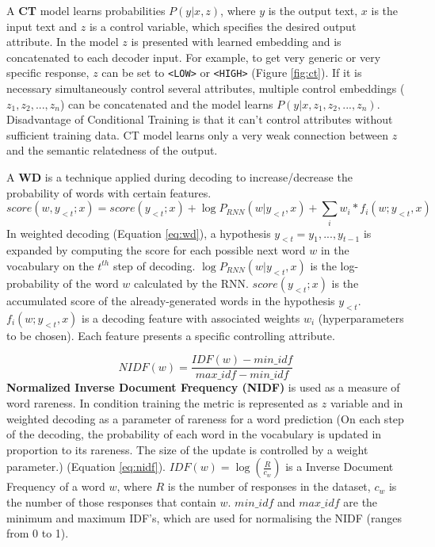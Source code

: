 A \textbf{CT} model learns probabilities $P(y|x,z)$, where $y$ is the output text, $x$ is the input text and $z$ is a control variable, which specifies the desired output attribute. In the model $z$ is presented with learned embedding and is concatenated to each decoder input. For example, to get very generic or very specific response, $z$ can be set to \texttt{<LOW>} or \texttt{<HIGH>} (Figure \ref{fig:ct}). If it is necessary simultaneously control several attributes, multiple control embeddings ($z_1, z_2, ..., z_n$) can be concatenated and the model learns $P(y|x, z_1, z_2, ..., z_n)$. Disadvantage of Conditional Training is that it can’t control attributes without sufficient training data. CT model learns only a very weak connection between $z$ and the semantic relatedness of the output.

A \textbf{WD} is a technique applied during decoding to increase/decrease the probability of words with certain features. 
\begin{equation} \label{eq:wd}
score(w, y_{<t}; x) = score(y_{<t}; x) + \log P_{RNN}(w|y_{<t}, x) + \sum_i w_i * f_i(w; y_{<t}, x)
\end{equation}
In weighted decoding (Equation \ref{eq:wd}), a hypothesis $y_{<t} = y_1, ..., y_{t-1}$ is expanded by computing the score for each possible next word $w$ in the vocabulary on the $t^{th}$ step of decoding. $\log P_{RNN}(w|y_{<t}, x)$ is the log-probability of the word $w$ calculated by the RNN. $score(y_{<t}; x)$ is the accumulated score of the already-generated words in the hypothesis $y_{<t}$. $f_i(w; y_{<t}, x)$ is a decoding feature with associated weights $w_i$ (hyperparameters to be chosen). Each feature presents a specific controlling attribute.

\begin{equation} \label{eq:nidf}
NIDF(w) = \frac{IDF(w) - min\_idf}{max\_idf - min\_idf}
\end{equation}
\textbf{Normalized Inverse Document Frequency (NIDF)} is used as a measure of word rareness. In condition training the metric is represented as $z$ variable and in weighted decoding as a parameter of rareness for a word prediction (On each step of the decoding, the probability of each word in the vocabulary is updated in proportion to its rareness. The size of the update is controlled by a weight parameter.) (Equation \ref{eq:nidf}). $IDF(w) = \log(\frac{R}{c_w})$ is a Inverse Document Frequency of a word $w$, where $R$ is the number of responses in the dataset, $c_w$ is the number of those responses that contain $w$. $min\_idf$ and $max\_idf$ are the minimum and maximum IDF's, which are used for normalising the NIDF (ranges from 0 to 1).

